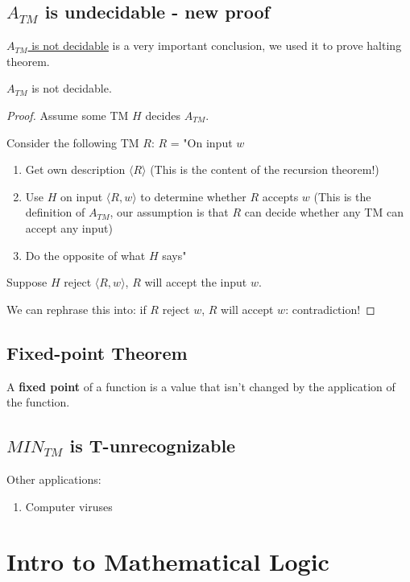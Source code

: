 \subsection{\(A_{TM}\) is undecidable - new proof}
\hyperref[theorem: A(TM) not decidable]{\(A_{TM}\) is not decidable} is a very important conclusion, we used it to prove halting theorem.

\begin{theorem}
    \(A_{TM}\) is not decidable. 
\end{theorem}
\begin{proof}
    Assume some TM \(H\) decides \(A_{TM}\). 

    Consider the following TM \(R\):
    \(R\) = "On input \(w\)
    \begin{enumerate}
        \item Get own description \(\langle R \rangle\) (This is the content of the recursion theorem!)
        \item Use \(H\) on input \(\langle R, w \rangle\)  to determine whether \(R\) accepts \(w\) (This is the definition of \(A_{TM}\), our assumption is that \(R\) can decide whether any TM can accept any input)
        \item Do the opposite of what \(H\) says"
    \end{enumerate}   

    Suppose \(H\) reject \(\langle R, w \rangle\), \(R\) will accept the input \(w\). 

    We can rephrase this into: if \(R\) reject \(w\), \(R\) will accept \(w\): contradiction!     
\end{proof}
    

\subsection{Fixed-point Theorem}
    A \textbf{fixed point} of a function is a value that isn't changed by the application of the function.  
\subsection{\(MIN_{TM}\) is T-unrecognizable}

Other applications:
\begin{enumerate}
    \item Computer viruses
\end{enumerate}

\section{Intro to Mathematical Logic}
\begin{definition}[Goal]
    
\end{definition}


\begin{example}
    
\end{example}


